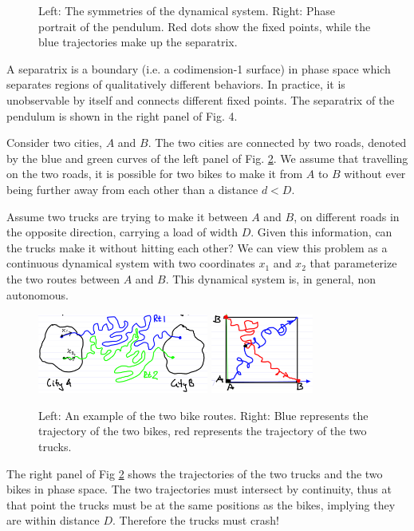 \begin{ex}[Pendulum]
\begin{figure}[h!]
	\caption{Left: The symmetries of the dynamical system. Right: Phase portrait of the pendulum. Red dots show the fixed points, while the blue trajectories make up the separatrix.} \label{fig:pendulum_symm+traj}
\end{figure}
\begin{definition}
	A separatrix is a boundary (i.e. a codimension-1 surface) in phase space which separates regions of qualitatively different behaviors. In practice, it is unobservable by itself and connects different fixed points. The separatrix of the pendulum is shown in the right panel of Fig. 4.
\end{definition}

\end{ex}

\begin{ex}
	Consider two cities, $A$ and $B$. The two cities are connected by two roads, denoted by the blue and green curves of the left panel of Fig. \ref{fig:two_cities}. We assume that travelling on the two roads, it is possible for two bikes to make it from $A$ to $B$ without ever being further away from each other than a distance $d<D$.

Assume two trucks are trying to make it between $A$ and $B$, on different roads in the opposite direction, carrying a load of width $D$. Given this information, can the trucks make it without hitting each other? We can view this problem as a continuous dynamical system with two coordinates $x_1$ and $x_2$ that parameterize the two routes between $A$ and $B$. This dynamical system is, in general, non autonomous.
	\begin{figure}[h!]
		\centering
		\includegraphics[width=0.5\textwidth]{figures/intro/7routes.png}
		\hspace{0.05\textwidth}
		\includegraphics[width=0.3\textwidth]{figures/intro/8truck_geometry.png}
		\caption{Left: An example of the two bike routes. Right: Blue represents the trajectory of the two bikes, red represents the trajectory of the two trucks.} \label{fig:two_cities}
	\end{figure}

	The right panel of Fig \ref{fig:two_cities} shows the trajectories of the two trucks and the two bikes in phase space. The two trajectories must intersect by continuity, thus at that point the trucks must be at the same positions as the bikes, implying they are within distance $D$. Therefore the trucks must crash!	
\end{ex}


